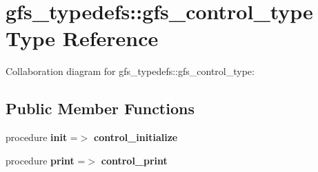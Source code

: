 \section{gfs\+\_\+typedefs\+:\+:gfs\+\_\+control\+\_\+type Type Reference}
\label{structgfs__typedefs_1_1gfs__control__type}


Collaboration diagram for gfs\+\_\+typedefs\+:\+:gfs\+\_\+control\+\_\+type\+:
\subsection*{Public Member Functions}
\begin{DoxyCompactItemize}
\item 
procedure \textbf{ init} =$>$ \textbf{ control\+\_\+initialize}
\item 
procedure \textbf{ print} =$>$ \textbf{ control\+\_\+print}
\end{DoxyCompactItemize}
